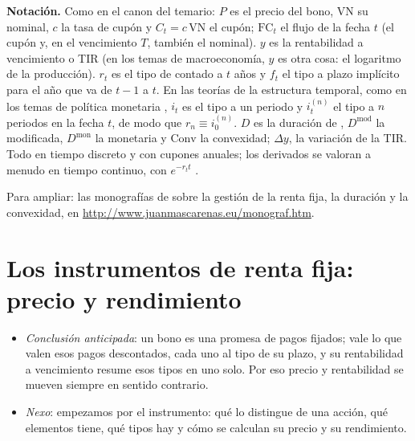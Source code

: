 \documentclass[11pt]{article}
\begin{document}
\begin{anotaciones}
\textbf{Notación.} Como en el canon del temario: $P$ es el precio del bono, $\mathrm{VN}$ su nominal, $c$ la tasa de cupón y $C_t=c\,\mathrm{VN}$ el cupón; $\mathrm{FC}_t$ el flujo de la fecha $t$ (el cupón y, en el vencimiento $T$, también el nominal). $y$ es la rentabilidad a vencimiento o TIR (en los temas de macroeconomía, $y$ es otra cosa: el logaritmo de la producción). $r_t$ es el tipo de contado a $t$ años y $f_t$ el tipo a plazo implícito para el año que va de $t-1$ a $t$. En las teorías de la estructura temporal, como en los temas de política monetaria , $i_t$ es el tipo a un periodo y $i^{(n)}_t$ el tipo a $n$ periodos en la fecha $t$, de modo que $r_n\equiv i^{(n)}_0$. $D$ es la duración de , $D^{\mathrm{mod}}$ la modificada, $D^{\mathrm{mon}}$ la monetaria y $\mathrm{Conv}$ la convexidad; $\Delta y$, la variación de la TIR. Todo en tiempo discreto y con cupones anuales; los derivados se valoran a menudo en tiempo continuo, con $e^{-r_tt}$ .
\end{anotaciones}

\begin{anotaciones}
Para ampliar: las monografías de  sobre la gestión de la renta fija, la duración y la convexidad\nocite{Mascarenas2026Monografias}, en \url{http://www.juanmascarenas.eu/monograf.htm}.
\end{anotaciones}

\section{Los instrumentos de renta fija:\cortetitulo{} precio y rendimiento}\label{sec:instrumentos}

\begin{itemize}
\item \emph{Conclusión anticipada}: un bono es una promesa de pagos fijados; vale lo que valen esos pagos descontados, cada uno al tipo de su plazo, y su rentabilidad a vencimiento resume esos tipos en uno solo. Por eso precio y rentabilidad se mueven siempre en sentido contrario.
\item \emph{Nexo}: empezamos por el instrumento: qué lo distingue de una acción, qué elementos tiene, qué tipos hay y cómo se calculan su precio y su rendimiento.
\end{itemize}
\end{document}

